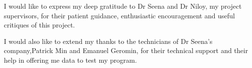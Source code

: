 I would like to express my deep gratitude to Dr Seena and Dr Niloy, my project supervisors, for their patient guidance, enthusiastic encouragement and useful critiques of this project. 

I would also like to extend my thanks to the technicians of Dr Seena's company,Patrick Min and Emanuel Geromin, for their technical support and their help in offering me data to test my program.
